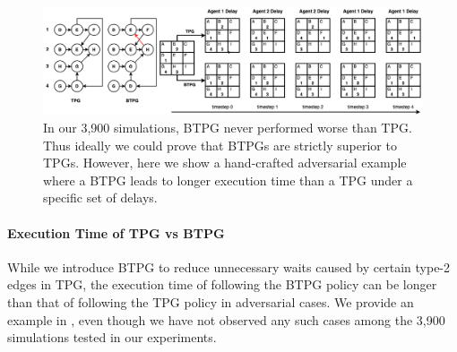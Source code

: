 \documentclass[letterpaper]{article} %
\theoremstyle{definition}
\begin{document}
\begin{figure}[h]
    \centering
    \includegraphics[width=\textwidth]{Figs/BTPGWorseEx.png}
    \caption{In our 3,900 simulations, BTPG never performed worse than TPG. 
    Thus ideally we could prove that BTPGs are strictly superior to TPGs. 
    However, here we show a hand-crafted adversarial example where a BTPG leads to longer execution time than a TPG under a specific set of delays.
    }
    \label{fig:counter-ex}
\end{figure}
\paragraph{Execution Time of TPG vs BTPG} While we introduce BTPG to reduce unnecessary waits caused by certain type-2 edges in TPG, the execution time of following the BTPG policy can be longer than that of following the TPG policy in adversarial cases. We provide an example in , even though we have not observed any such cases among the 3,900 simulations tested in our experiments. 

\end{document}
